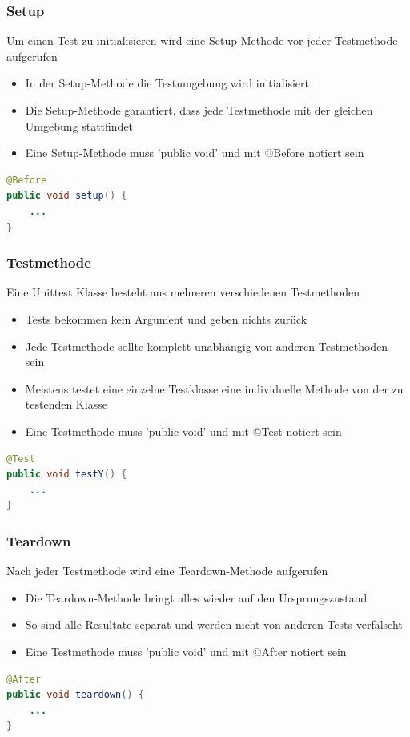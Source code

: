 \documentclass[a4paper,10pt]{article}
\begin{document}
\subsubsection{Setup}
Um einen Test zu initialisieren wird eine Setup-Methode vor jeder Testmethode aufgerufen
\begin{itemize}
	\item In der Setup-Methode die Testumgebung wird initialisiert
	\item Die Setup-Methode garantiert, dass jede Testmethode mit der gleichen Umgebung stattfindet
	\item Eine Setup-Methode muss 'public void' und mit @Before notiert sein 
\end{itemize}
\begin{lstlisting}[language=Java,caption=Unit Test (Before), style=MyJavaStyle]
@Before
public void setup() {
	... 
}
\end{lstlisting}

\subsubsection{Testmethode}
Eine Unittest Klasse besteht aus mehreren verschiedenen Testmethoden
\begin{itemize}
	\item Tests bekommen kein Argument und geben nichts zurück
	\item Jede Testmethode sollte komplett unabhängig von anderen Testmethoden sein
	\item Meistens testet eine einzelne Testklasse eine individuelle Methode von der zu testenden Klasse
	\item Eine Testmethode muss 'public void' und mit @Test notiert sein
\end{itemize}
\begin{lstlisting}[language=Java,caption=Unit Test (Test), style=MyJavaStyle]
@Test
public void testY() {
	... 
}
\end{lstlisting}

\subsubsection{Teardown}
Nach jeder Testmethode wird eine Teardown-Methode aufgerufen
\begin{itemize}
	\item Die Teardown-Methode bringt alles wieder auf den Ursprungszustand
	\item So sind alle Resultate separat und werden nicht von anderen Tests verfälscht
	\item Eine Testmethode muss 'public void' und mit @After notiert sein
\end{itemize}
\begin{lstlisting}[language=Java,caption=Unit Test (After), style=MyJavaStyle]
@After
public void teardown() {
	... 
}
\end{lstlisting}
\end{document}
